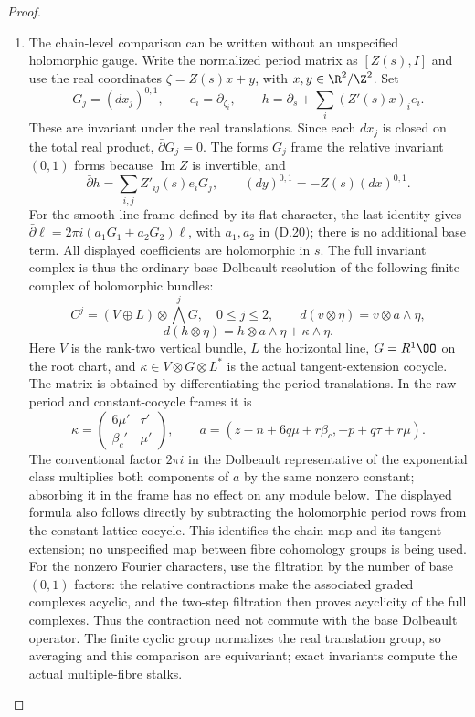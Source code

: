 \begin{proof}
\begin{enumerate}[label=\arabic*.,leftmargin=*]
\item The chain-level comparison can be written without an unspecified
holomorphic gauge. Write the normalized period matrix as $[Z(s),I]$
and use the real coordinates $\zeta=Z(s)x+y$, with
$x,y\in\R^2/\Z^2$. Set
\[
 G_j=(dx_j)^{0,1},\qquad e_i=\partial_{\zeta_i},\qquad
 h=\partial_s+\sum_i(Z'(s)x)_i e_i.
\]
These are invariant under the real translations. Since each $dx_j$
is closed on the total real product, $\bar\partial G_j=0$.
The forms $G_j$ frame the relative invariant $(0,1)$ forms because
$\operatorname{Im}Z$ is invertible, and
\[
 \bar\partial h=\sum_{i,j}Z'_{ij}(s)e_iG_j,
 \qquad (dy)^{0,1}=-Z(s)(dx)^{0,1}.
\]
For the smooth line frame defined by its flat character, the last
identity gives $\bar\partial\ell=2\pi i(a_1G_1+a_2G_2)\ell$,
with $a_1,a_2$ in (D.20); there is no additional base term.
All displayed coefficients are holomorphic in $s$. The full
invariant complex is thus the ordinary base Dolbeault resolution
of the following finite complex of holomorphic bundles:
\[
 C^j=(V\oplus L)\otimes\bigwedge^jG,\quad0\le j\le2,
 \qquad
 d(v\otimes\eta)=v\otimes a\wedge\eta,
\]
\[
 d(h\otimes\eta)=h\otimes a\wedge\eta+\kappa\wedge\eta. \tag{D.19}
\]
Here $V$ is the rank-two vertical bundle, $L$ the horizontal line,
$G=R^1\OO$ on the root chart, and $\kappa\in V\otimes G\otimes L^*$
is the actual tangent-extension cocycle. The matrix is obtained
by differentiating the period translations. In the raw period and
constant-cocycle frames it is
\[
 \kappa=\begin{pmatrix}6\mu'&\tau'\\\beta_c'&\mu'\end{pmatrix},
 \qquad
 a=(z-n+6q\mu+r\beta_c,-p+q\tau+r\mu).               \tag{D.20}
\]
The conventional factor $2\pi i$ in the Dolbeault representative of
the exponential class multiplies both components of $a$ by the
same nonzero constant; absorbing it in the frame has no effect on
any module below. The displayed formula also follows directly by
subtracting the holomorphic period rows from the constant lattice
cocycle. This identifies the chain map and its tangent extension;
no unspecified map between fibre cohomology groups is being used.
For the nonzero Fourier characters, use the filtration by the number
of base $(0,1)$ factors: the relative contractions make the associated
graded complexes acyclic, and the two-step filtration then proves
acyclicity of the full complexes. Thus the contraction need not
commute with the base Dolbeault operator. The finite cyclic group
normalizes the real translation group, so averaging and this
comparison are equivariant; exact invariants compute the actual
multiple-fibre stalks.


\end{enumerate}
\end{proof}
